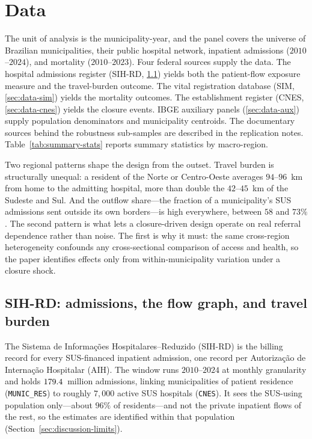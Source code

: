 \section{Data}
\label{sec:data}

The unit of analysis is the municipality-year, and the panel covers the
universe of Brazilian municipalities, their public hospital network,
inpatient admissions ($2010$--$2024$), and mortality ($2010$--$2023$).
Four federal sources supply the data. The hospital admissions register
(SIH-RD, \ref{sec:data-sih}) yields both the patient-flow exposure
measure and the travel-burden outcome. The vital registration database
(SIM, \ref{sec:data-sim}) yields the mortality outcomes. The
establishment register (CNES, \ref{sec:data-cnes}) yields the closure
events. IBGE auxiliary panels (\ref{sec:data-aux}) supply population
denominators and municipality centroids. The documentary sources behind
the robustness sub-samples are described in the replication notes.
Table~\ref{tab:summary-stats} reports summary statistics by macro-region.

Two regional patterns shape the design from the outset. Travel burden is
structurally unequal: a resident of the Norte or Centro-Oeste averages
$94$--$96$~km from home to the admitting hospital, more than double the
$42$--$45$~km of the Sudeste and Sul. And the outflow share---the fraction
of a municipality's SUS admissions sent outside its own borders---is high
everywhere, between $58$ and $73\%$. The second pattern is what lets a
closure-driven design operate on real referral dependence rather than
noise. The first is why it must: the same cross-region heterogeneity
confounds any cross-sectional comparison of access and health, so the
paper identifies effects only from within-municipality variation under a
closure shock.

\subsection{SIH-RD: admissions, the flow graph, and travel burden}
\label{sec:data-sih}

The Sistema de Informações Hospitalares--Reduzido (SIH-RD) is the billing
record for every SUS-financed inpatient admission, one record per
Autorização de Internação Hospitalar (AIH). The window runs
$2010$--$2024$ at monthly granularity and holds $179.4$~million
admissions, linking municipalities of patient residence
(\texttt{MUNIC\_RES}) to roughly $7{,}000$ active SUS hospitals
(\texttt{CNES}). It sees the SUS-using population only---about $96\%$ of
residents---and not the private inpatient flows of the rest, so the
estimates are identified within that population
(Section~\ref{sec:discussion-limits}).

